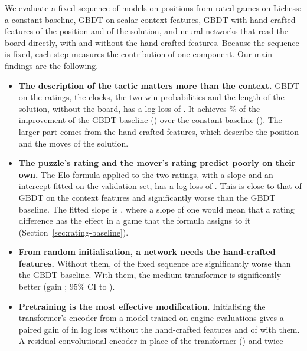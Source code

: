 \documentclass[11pt]{article}
\begin{document}
We evaluate a fixed sequence of models on  positions from rated
games on Lichess: a constant baseline, GBDT on scalar context features, GBDT
with hand-crafted features of the position and of the solution, and neural
networks that read the board directly, with and without the hand-crafted
features. Because the sequence is fixed, each step measures the contribution
of one component. Our main findings are the following.
\begin{itemize}
\item \textbf{The description of the tactic matters more than the context.}
GBDT on the ratings, the clocks, the two win probabilities and the length of
the solution, without the board, has a log loss of
. It achieves \% of the
improvement of the GBDT baseline () over the constant
baseline (). The larger part comes from the hand-crafted
features, which describe the position and the moves of the solution.
\item \textbf{The puzzle's rating and the mover's rating predict poorly on
their own.} The Elo formula applied to the two ratings, with a slope and an
intercept fitted on the validation set, has a log loss of
. This is close to that of GBDT on the context
features and significantly worse than the GBDT baseline. The fitted slope is
, where a slope of one would mean that a
rating difference has the effect in a game that the formula assigns to it
(Section~\ref{sec:rating-baseline}).
\item \textbf{From random initialisation, a network needs the hand-crafted
features.} Without them,  of the fixed sequence are
significantly worse than the GBDT baseline. With them, the medium transformer
is significantly better (gain ; 95\% CI
 to
).
\ifchangestart
\item \textbf{Pretraining is the most effective modification.} Initialising
the transformer's encoder from a model trained on engine evaluations gives a
paired gain of 
in log loss without the hand-crafted features and of
 with
them.\ifchangeconv{} A residual convolutional encoder in place of the
transformer
()\ifmore{} and twice

\end{itemize}
\end{document}
